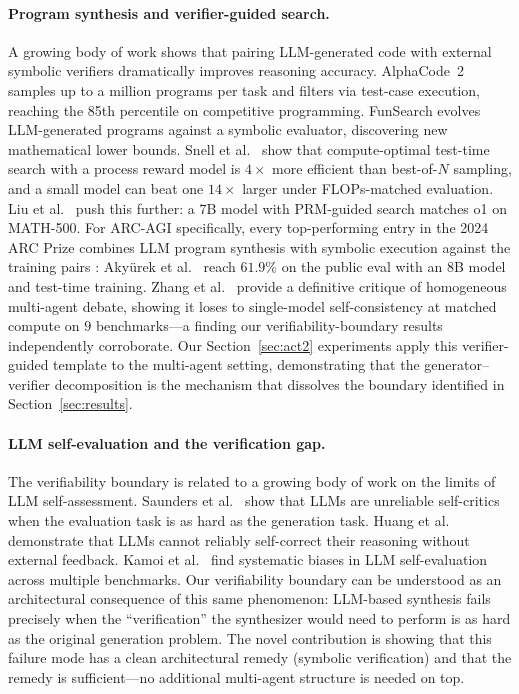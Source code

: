 \documentclass[11pt]{amsart}
\newcommand\1{{\mathds{1}}}
\theoremstyle{definition}
\theoremstyle{remark}
\numberwithin{equation}{section}
\begin{document}
\paragraph{Program synthesis and verifier-guided search.}
A growing body of work shows that pairing LLM-generated code with external symbolic verifiers dramatically improves reasoning accuracy.
AlphaCode~2 \cite{Li2022AlphaCode} samples up to a million programs per task and filters via test-case execution, reaching the 85th percentile on competitive programming.
FunSearch \cite{RomeraParedes2024FunSearch} evolves LLM-generated programs against a symbolic evaluator, discovering new mathematical lower bounds.
Snell et al.\ \cite{Snell2024ComputeOptimalTTS} show that compute-optimal test-time search with a process reward model is $4\times$ more efficient than best-of-$N$ sampling, and a small model can beat one $14\times$ larger under FLOPs-matched evaluation.
Liu et al.\ \cite{Liu2025Can1BSurpass405B} push this further: a $7$B model with PRM-guided search matches o1 on MATH-500.
For ARC-AGI specifically, every top-performing entry in the 2024 ARC Prize combines LLM program synthesis with symbolic execution against the training pairs \cite{ARCPrize2024Report}: Aky\"urek et al.\ \cite{Akyurek2024TTT} reach $61.9\%$ on the public eval with an $8$B model and test-time training.
Zhang et al.\ \cite{Zhang2025StopOvervaluingMAD} provide a definitive critique of homogeneous multi-agent debate, showing it loses to single-model self-consistency at matched compute on $9$ benchmarks---a finding our verifiability-boundary results independently corroborate.
Our Section~\ref{sec:act2} experiments apply this verifier-guided template to the multi-agent setting, demonstrating that the generator--verifier decomposition is the mechanism that dissolves the boundary identified in Section~\ref{sec:results}.

\paragraph{LLM self-evaluation and the verification gap.}
The verifiability boundary is related to a growing body of work on the limits of LLM self-assessment.
Saunders et al.\ \cite{Saunders2022SelfCritique} show that LLMs are unreliable self-critics when the evaluation task is as hard as the generation task.
Huang et al.\ \cite{Huang2023SelfCorrection} demonstrate that LLMs cannot reliably self-correct their reasoning without external feedback.
Kamoi et al.\ \cite{Kamoi2024SelfEval} find systematic biases in LLM self-evaluation across multiple benchmarks.
Our verifiability boundary can be understood as an architectural consequence of this same phenomenon: LLM-based synthesis fails precisely when the ``verification'' the synthesizer would need to perform is as hard as the original generation problem.
The novel contribution is showing that this failure mode has a clean architectural remedy (symbolic verification) and that the remedy is sufficient---no additional multi-agent structure is needed on top.
\end{document}
